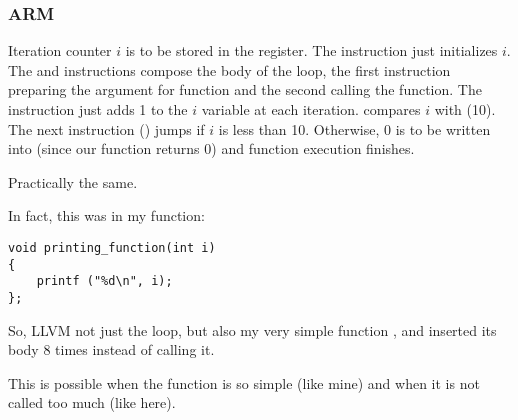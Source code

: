 \subsubsection{ARM}

\myparagraph{\NonOptimizingKeilVI (\ARMMode)}



Iteration counter $i$ is to be stored in the  register.
The  instruction just initializes $i$.
The  and  instructions
compose the body of the loop, the first instruction preparing the argument for 
\ttf function and the second calling the function.
The  instruction just adds 1 to the $i$ variable at each iteration.
 compares $i$ with  (10). 
The next instruction  () jumps if $i$ is less than 10.
Otherwise, 0 is to be written into  (since our function returns 0)
and function execution finishes.

\myparagraph{\OptimizingKeilVI (\ThumbMode)}



Practically the same.

\myparagraph{\OptimizingXcodeIV (\ThumbTwoMode)}
\label{ARM_unrolled_loops}



In fact, this was in my \ttf function:

\begin{lstlisting}[style=customc]
void printing_function(int i)
{
    printf ("%d\n", i);
};
\end{lstlisting}

So, LLVM not just  the loop, 
but also  my 
very simple function \ttf,
and inserted its body 8 times instead of calling it. 

This is possible when the function is so simple (like mine) and when it is not called too much (like here).






